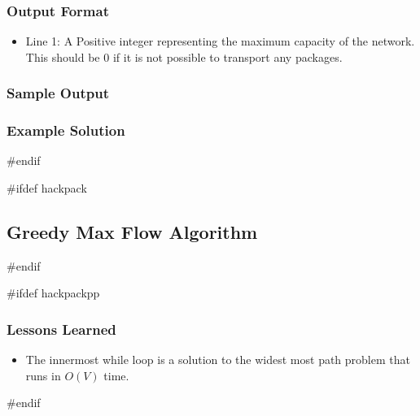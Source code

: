 \subsubsection{Output Format}
\begin{itemize}
	\item Line 1: A Positive integer representing the maximum capacity of the network.
		This should be 0 if it is not possible to transport any packages.
\end{itemize}
\subsubsection{Sample Output}
\subsubsection{Example Solution}
#endif

#ifdef hackpack
\subsection{Greedy Max Flow Algorithm}
#endif

#ifdef hackpackpp
\subsubsection{Lessons Learned}
\begin{itemize}
	\item The innermost while loop is a solution to the widest most path problem that runs in $O(V)$ time.
\end{itemize}
#endif

